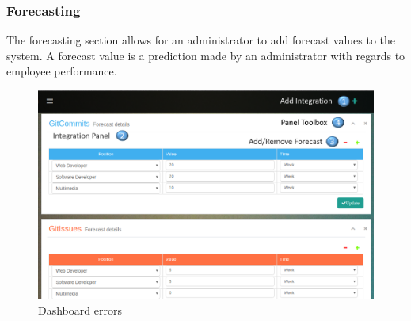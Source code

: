 \documentclass[11pt,a4paper]{article}
\begin{document}
\pagebreak

\subsubsection{Forecasting}
The forecasting section allows for an administrator to add forecast values to the system. A forecast value is a prediction made by an administrator with regards to employee performance.
\begin{figure}[H]
	\begin{center}
		\includegraphics[width=\linewidth]{../Images/Getting_Started/forecast_numbered}
		\caption{Dashboard errors}
	\end{center}
\end{figure}
\end{document}
